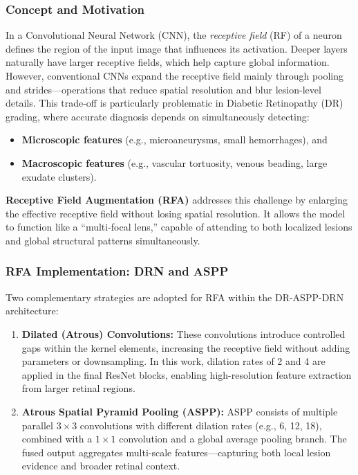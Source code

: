 \documentclass[12pt,a4paper]{article}
\begin{document}
\subsubsection{Concept and Motivation}
In a Convolutional Neural Network (CNN), the \textit{receptive field} (RF) of a neuron defines the region of the input image that influences its activation.  
Deeper layers naturally have larger receptive fields, which help capture global information.  
However, conventional CNNs expand the receptive field mainly through pooling and strides—operations that reduce spatial resolution and blur lesion-level details.  
This trade-off is particularly problematic in Diabetic Retinopathy (DR) grading, where accurate diagnosis depends on simultaneously detecting:
\begin{itemize}[noitemsep, topsep=0pt]
    \item \textbf{Microscopic features} (e.g., microaneurysms, small hemorrhages), and
    \item \textbf{Macroscopic features} (e.g., vascular tortuosity, venous beading, large exudate clusters).
\end{itemize}

\textbf{Receptive Field Augmentation (RFA)} addresses this challenge by enlarging the effective receptive field without losing spatial resolution.  
It allows the model to function like a “multi-focal lens,” capable of attending to both localized lesions and global structural patterns simultaneously.

\subsubsection{RFA Implementation: DRN and ASPP}
Two complementary strategies are adopted for RFA within the DR-ASPP-DRN architecture:

\begin{enumerate}
    \item \textbf{Dilated (Atrous) Convolutions:} These convolutions introduce controlled gaps within the kernel elements, increasing the receptive field without adding parameters or downsampling.  
    In this work, dilation rates of 2 and 4 are applied in the final ResNet blocks, enabling high-resolution feature extraction from larger retinal regions.
    \item \textbf{Atrous Spatial Pyramid Pooling (ASPP):} ASPP consists of multiple parallel $3\times3$ convolutions with different dilation rates (e.g., 6, 12, 18), combined with a $1\times1$ convolution and a global average pooling branch.  
    The fused output aggregates multi-scale features—capturing both local lesion evidence and broader retinal context.
\end{enumerate}
\end{document}
